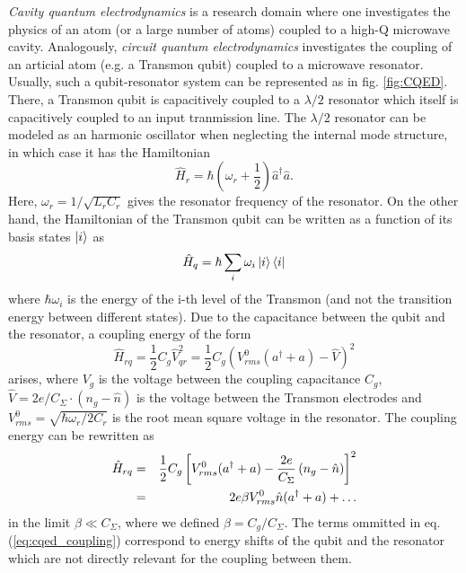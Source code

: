 {\it Cavity quantum electrodynamics} is a research domain where one investigates the physics of an atom (or a large number of atoms) coupled to a high-Q microwave cavity. Analogously, {\it circuit quantum electrodynamics} investigates the coupling of an articial atom (e.g. a Transmon qubit) coupled to a microwave resonator. Usually, such a qubit-resonator system can be represented as in fig. \ref{fig:CQED}. There, a Transmon qubit is capacitively coupled to a $\lambda/2$ resonator which itself is capacitively coupled to an input tranmission line. The $\lambda/2$ resonator can be modeled as an harmonic oscillator when neglecting the internal mode structure, in which case it has the Hamiltonian
%
\begin{equation}
\hat{H}_r = \hbar(\omega_r+\frac{1}{2})\hat{a}^\dagger\hat{a}.
\end{equation}
%
Here, $\omega_r = 1/\sqrt{L_r C_r}$ gives the resonator frequency of the resonator. On the other hand, the Hamiltonian of the Transmon qubit can be written as a function of its basis states $\left| i \right>$ as
%
\begin{equation}
\hat{H}_{q} = \hbar\sum\limits_i \omega_i \left| i \right>\left< i \right|
\end{equation}
%
where $\hbar\omega_i$ is the energy of the i-th level of the Transmon (and not the transition energy between different states). Due to the capacitance between the qubit and the resonator, a coupling energy of the form
%
\begin{equation}
\hat{H}_{rq} = \frac{1}{2}C_{g}\hat{V}_{qr}^2 = \frac{1}{2}C_g\left(V^0_{rms}(a^\dagger+a)-\hat{V}\right)^2
\end{equation}
%
arises, where $V_g$ is the voltage between the coupling capacitance $C_g$, $\hat{V}=2e/C_\Sigma \cdot(n_g-\hat{n})$ is the voltage between the Transmon electrodes and $V^0_{rms} = \sqrt{\hbar \omega_r/2C_r}$ is the root mean square voltage in the resonator. The coupling energy can be rewritten as
%
\begin{eqnarray}
\hat{H}_{rq} & = & \frac{1}{2}C_g\left[V_{rms}^0(a^\dagger+a)-\frac{2e}{C_\Sigma}\left(n_g-\hat{n}\right)\right]^2 \notag \\
       & = & 2e \beta V_{rms}^0\hat{n}(a^\dagger+a) + \hdots \label{eq:cqed_coupling}
\end{eqnarray}
%
in the limit $\beta \ll C_\Sigma$, where we defined $\beta = C_g/C_\Sigma$. The terms ommitted in eq. (\ref{eq:cqed_coupling}) correspond to energy shifts of the qubit and the resonator which are not directly relevant for the coupling between them. 
